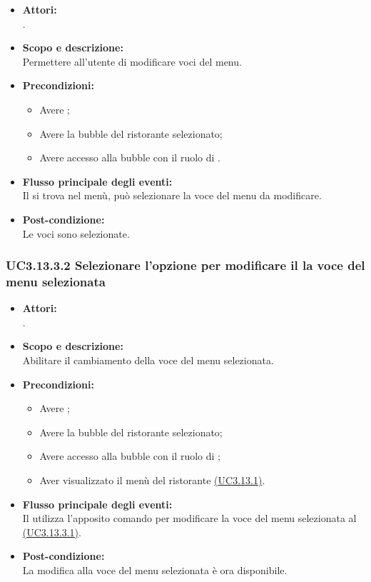 \begin{itemize}
	\item \textbf{Attori:}
	\\.
	\item \textbf{Scopo e descrizione:} 
	\\Permettere all’utente  di modificare voci del menu.
	\item \textbf{Precondizioni:}
	\begin{itemize}
		\item Avere ;
		\item Avere la bubble del ristorante selezionato;
		\item Avere accesso alla bubble con il ruolo di .
	\end{itemize}
	\item \textbf{Flusso principale degli eventi:}
	\\Il {} si trova nel menù, può selezionare la voce del menu da modificare.
	\item \textbf{Post-condizione:}
	\\Le voci sono selezionate.
\end{itemize}

\subsubsection{UC3.13.3.2 Selezionare l’opzione per modificare il la voce del menu selezionata} \label{UC3.13.3.2}

\begin{itemize}
	\item \textbf{Attori:}
	\\.
	\item \textbf{Scopo e descrizione:} 
	\\Abilitare il cambiamento della voce del menu selezionata.
	\item \textbf{Precondizioni:}
	\begin{itemize}
		\item Avere ;
		\item Avere la bubble del ristorante selezionato;
		\item Avere accesso alla bubble con il ruolo di ;
		\item Aver visualizzato il menù del ristorante \hyperref[UC3.13.1]{(UC3.13.1)}.
	\end{itemize}
	\item \textbf{Flusso principale degli eventi:}
	\\Il {} utilizza l'apposito comando per modificare la voce del menu selezionata al  \hyperref[UC3.13.3.1]{(UC3.13.3.1)}.
	\item \textbf{Post-condizione:}
	\\La modifica alla voce del menu selezionata è ora disponibile.
\end{itemize}

